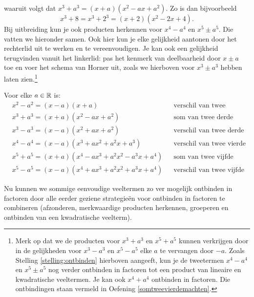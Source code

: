 \documentclass{ximera}
\begin{document}

waaruit volgt dat  $x^3 + a^3 = (x+a)(x^2-ax+a^2)$. Zo is dan bijvoorbeeld
\[
x^3+8 = x^3 + 2^3 = (x+2)(x^2-2x+4).
\]
Bij uitbreiding kun je ook producten herkennen voor $x^4-a^4$ en $x^5 \pm a^5$. Die vatten we hieronder samen. Ook hier kun je elke gelijkheid aantonen door het rechterlid uit te werken en te vereenvoudigen. Je kan ook een gelijkheid terugvinden vanuit het linkerlid: pas het kenmerk van deelbaarheid door $x \pm a$ toe en voer het schema van Horner uit, zoals we hierboven voor $x^3 \pm a^3$ hebben laten zien.\footnote{Merk op dat we de producten voor $x^3 + a^3$ en $x^5 + a^5$ kunnen verkrijgen door in de gelijkheden voor $x^3 - a^3$ en $x^5 - a^5$ elke $a$ te vervangen door $-a$. Zoals Stelling \ref{stelling:ontbinden} hierboven aangeeft, kun je de tweetermen $x^4 - a^4$ en $x^5 \pm a^5$ nog verder ontbinden in factoren tot een product van lineaire en kwadratische veeltermen. Je kan ook $x^4+a^4$ ontbinden in factoren. Die ontbindingen staan vermeld in Oefening \ref{somtweevierdemachten}.} 
	
\begin{proposition} 
Voor elke $a \in \mathbb{R}$ is:
\begin{align*}
& x^2 - a^2 = (x-a)(x+a) && \text{verschil van twee kwadraten} \\
& x^3 + a^3 = (x+a)(x^2 - ax + a^2) && \text{som van twee derde machten} \\
& x^3 - a^3 = (x-a)(x^2 + ax + a^2) && \text{verschil van twee derde machten} \\
& x^4 - a^4 = (x-a)(x^3 + ax^2 + a^2x + a^3) && \text{verschil van twee vierde machten} \\
& x^5 + a^5 = (x+a)(x^4 - ax^3 + a^2x^2 - a^3x + a^4) && \text{som van twee vijfde machten} \\
& x^5 - a^5 = (x-a)(x^4 + ax^3 + a^2x^2 + a^3x + a^4) && \text{verschil van twee vijfde machten.}
\end{align*}
\end{proposition} 



Nu kunnen we sommige eenvoudige veeltermen zo ver mogelijk ontbinden in factoren door alle eerder geziene strategieën voor ontbinden in factoren te combineren (afzonderen, merkwaardige producten herkennen, groeperen en ontbinden van een kwadratische veelterm).
\end{document}
